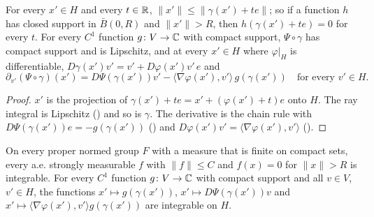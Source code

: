 \begin{lemma}
\label{lem:graph-ray-integral}
\leanok
{}
For every $x' \in H$ and every $t \in \mathbb{R}$, $\|x'\| \leq \|\gamma(x') + t e\|$; so if a function
$h$ has closed support in $\bar B(0, R)$ and $\|x'\| > R$, then $h(\gamma(x') + t e) = 0$ for
every $t$. For every $C^1$ function $g \colon V \to \mathbb{C}$ with compact support, $\Psi \circ \gamma$
has compact support and is Lipschitz, and at every $x' \in H$ where $\varphi|_H$ is
differentiable, $D\gamma(x') v' = v' + D\varphi(x') v' \, e$ and
\[
  \partial_{v'} (\Psi \circ \gamma)(x') = D\Psi(\gamma(x')) v'
    - \langle \nabla\varphi(x'), v' \rangle \, g(\gamma(x'))
  \quad \text{for every } v' \in H .
\]
\end{lemma}

\begin{proof}
\leanok
$x'$ is the projection of $\gamma(x') + t e = x' + (\varphi(x') + t) e$ onto $H$. The ray
integral is Lipschitz () and so is $\gamma$. The derivative is
the chain rule with $D\Psi(\gamma(x')) e = -g(\gamma(x'))$
() and
$D\varphi(x') v' = \langle \nabla\varphi(x'), v' \rangle$ ().
\end{proof}

\begin{lemma}
\label{lem:hyperplane-integrable}
\leanok
{}
On every proper normed group $F$ with a measure that is finite on compact sets, every a.e.
strongly measurable $f$ with $\|f\| \leq C$ and $f(x) = 0$ for $\|x\| > R$ is integrable. For
every $C^1$ function $g \colon V \to \mathbb{C}$ with compact support and all $v \in V$, $v' \in H$, the
functions $x' \mapsto g(\gamma(x'))$, $x' \mapsto D\Psi(\gamma(x')) v$ and
$x' \mapsto \langle \nabla\varphi(x'), v' \rangle g(\gamma(x'))$ are integrable on $H$.
\end{lemma}


